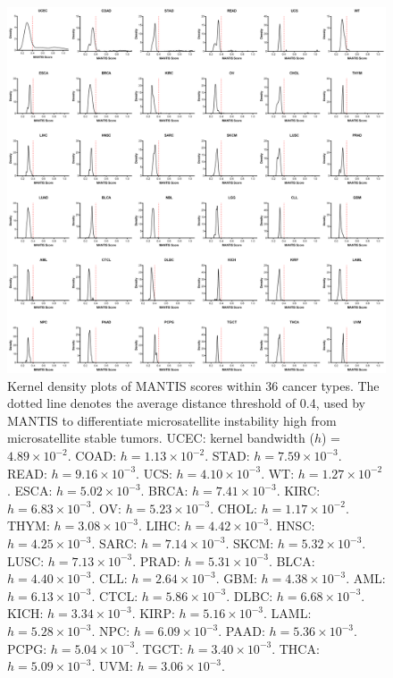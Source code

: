 \begin{figure}[htp]
    \centering
    \includegraphics[width=0.98\linewidth,keepaspectratio]{images/msilandscape/landscape_kd_others}
    \caption[Kernel density plots of MANTIS scores within 36 cancer types.]{Kernel density plots of MANTIS scores within 36 cancer types. The dotted line denotes the average distance threshold of 0.4, used by MANTIS to differentiate microsatellite instability high from microsatellite stable tumors. UCEC: kernel bandwidth ($h$) = $4.89 \times 10^{-2}$. COAD: $h = 1.13 \times 10^{-2}$. STAD: $h = 7.59 \times 10^{-3}$. READ: $h = 9.16 \times 10^{-3}$. UCS: $h = 4.10 \times 10^{-3}$. WT: $h = 1.27 \times 10^{-2}$. ESCA: $h = 5.02 \times 10^{-3}$. BRCA: $h = 7.41 \times 10^{-3}$. KIRC: $h = 6.83 \times 10^{-3}$. OV: $h = 5.23 \times 10^{-3}$. CHOL: $h = 1.17 \times 10^{-2}$. THYM: $h = 3.08 \times 10^{-3}$. LIHC: $h = 4.42 \times 10^{-3}$. HNSC: $h = 4.25 \times 10^{-3}$. SARC: $h = 7.14 \times 10^{-3}$. SKCM: $h = 5.32 \times 10^{-3}$. LUSC: $h = 7.13 \times 10^{-3}$. PRAD: $h = 5.31 \times 10^{-3}$. BLCA: $h = 4.40 \times 10^{-3}$. CLL: $h = 2.64 \times 10^{-3}$. GBM: $h = 4.38 \times 10^{-3}$. AML: $h = 6.13 \times 10^{-3}$. CTCL: $h = 5.86 \times 10^{-3}$. DLBC: $h = 6.68 \times 10^{-3}$. KICH: $h = 3.34 \times 10^{-3}$. KIRP: $h = 5.16 \times 10^{-3}$. LAML: $h = 5.28 \times 10^{-3}$. NPC: $h = 6.09 \times 10^{-3}$. PAAD: $h = 5.36 \times 10^{-3}$. PCPG: $h = 5.04 \times 10^{-3}$. TGCT: $h = 3.40 \times 10^{-3}$. THCA: $h = 5.09 \times 10^{-3}$. UVM: $h = 3.06 \times 10^{-3}$.}
    \label{fig:msilandscape:landscape_kd_others}
\end{figure}

